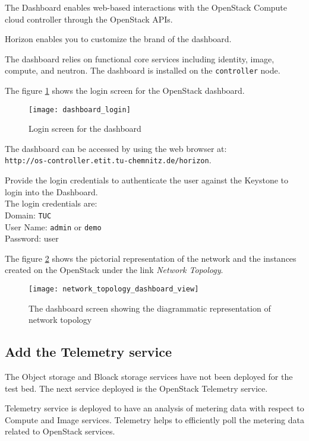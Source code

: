 The Dashboard enables web-based interactions with the OpenStack Compute cloud controller through the OpenStack APIs.

Horizon enables you to customize the brand of the dashboard.

The dashboard relies on functional core services including identity, image, compute, and neutron.
The dashboard is installed on the \verb|controller| node.

The figure \ref{fig:dashboard_login} shows the login screen for the OpenStack dashboard.

\begin{figure}[H]
  \centering
  \texttt{[image: dashboard\_login]}
  \caption{Login screen for the dashboard}\label{fig:dashboard_login}
\end{figure}
The dashboard can be accessed by using the web browser at: \\\verb|http://os-controller.etit.tu-chemnitz.de/horizon|.

Provide the login credentials to authenticate the user against the Keystone to login into the Dashboard.\\

The login credentials are:
\\Domain: \verb|TUC|
\\User Name: \verb|admin| or \verb|demo|
\\Password: user

The figure \ref{fig:network_topology_dashboard_view} shows the pictorial representation of the network and the instances created on the OpenStack under the link \textit{Network Topology}.

\begin{figure}[H]
  \centering
  \texttt{[image: network\_topology\_dashboard\_view]}
  \caption{The dashboard screen showing the diagrammatic representation of network topology}\label{fig:network_topology_dashboard_view}
\end{figure}

\subsection{Add the Telemetry service}\label{ssec:AddtheTelemetryservice}
The Object storage and Bloack storage services have not been deployed for the test bed.
The next service deployed is the OpenStack Telemetry service.

Telemetry service is deployed to have an analysis of metering data with respect to Compute and Image services.
Telemetry helps to efficiently poll the metering data related to OpenStack services.

